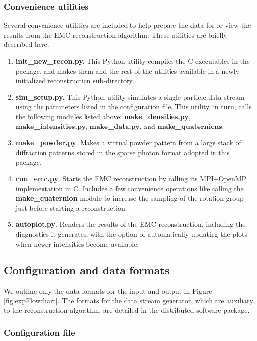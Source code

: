 \documentclass[preprint]{iucr}              %
\begin{document}
\subsubsection{Convenience utilities}\label{subsubsec:utils}
Several convenience utilities are included to help prepare the data for or view the results from the EMC reconstruction algorithm. These utilities are briefly described here. 
\begin{enumerate}
\item{\bf init\_new\_recon.py.} This Python utility compiles the C executables in the package, and makes them and the rest of the utilities available in a newly initialized reconstruction sub-directory.
\item{\bf sim\_setup.py.} This Python utility simulates a single-particle data stream using the parameters listed in the configuration file. This utility, in turn, calls the following modules listed above: {\bf make\_densities.py}, {\bf make\_intensities.py}, {\bf make\_data.py}, and {\bf make\_quaternions}.
\item{\bf make\_powder.py}. Makes a virtual powder pattern from a large stack of diffraction patterns stored in the sparse photon format adopted in this package.
\item{\bf run\_emc.py}. Starts the EMC reconstruction by calling its MPI+OpenMP implementation in C. Includes a few convenience operations like calling the {\bf make\_quaternion} module to increase the sampling of the rotation group just before starting a reconstruction.
\item{\bf autoplot.py}. Renders the results of the EMC reconstruction, including the diagnostics it generates, with the option of automatically updating the plots when newer intensities become available.
\end{enumerate}


\subsection{Configuration and data formats}\label{subsec:formats}

We outline only the data formats for the input and output in Figure \ref{fig:expFlowchart}. The formats for the data stream generator, which are auxiliary to the reconstruction algorithm, are detailed in the distributed software package. 

\subsubsection{Configuration file}\label{subsubsec:config}
\end{document}
